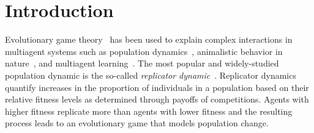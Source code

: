 \documentclass{aamas2014}
\begin{document}



\section{Introduction}


Evolutionary game theory~\cite{MaynardSmith82,Gintis09} has been used to explain complex interactions in multiagent 
systems such as population dynamics~\cite{HS98}, animalistic behavior in nature~\cite{MSP73}, and 
multiagent learning~\cite{Tuyls07What,Tuyls03Selection}. The most popular and widely-studied population dynamic is the
so-called {\it replicator dynamic}~\cite{TJ78}. Replicator dynamics quantify 
increases in the proportion of individuals in a population based on their relative fitness levels as determined through 
payoffs of competitions. Agents with higher fitness replicate more than agents with lower fitness and the resulting 
process leads to an evolutionary game that models population change. 
\end{document}
